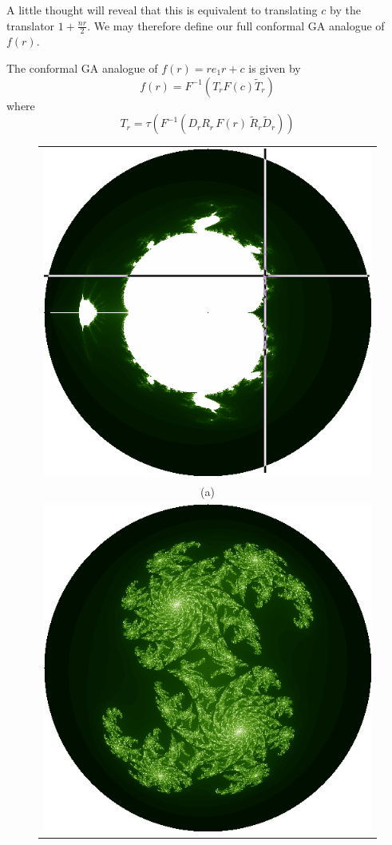 A little thought will reveal that this is equivalent to translating $c$ by the translator
$1 + \frac{nr}{2}$. We may therefore define our full conformal GA analogue of $f(r)$.

\begin{definition}
The conformal GA analogue of $f(r) = re_1r + c$ is given by
\[
f(r) = F^{-1}(T_r F(c) \tilde{T}_r)
\]
where
\[
T_r = \tau(F^{-1}(D_r R_r\,F(r)\,\tilde{R}_r \tilde{D}_r))
\]
\end{definition}

\begin{figure}[p]
\centering
\begin{tabular}{c}
\includegraphics[width=0.35\textheight]{hyp_mandel_julia_pos} \\ (a) \\
\includegraphics[width=0.35\textheight]{julia_hyp} \\

\end{tabular}
\end{figure}
